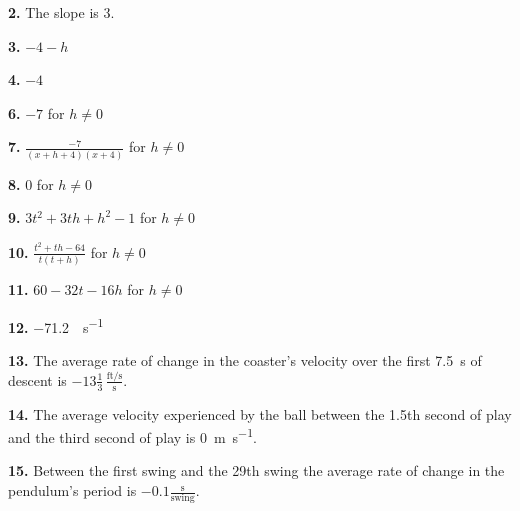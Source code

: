 \documentclass[12pt,]{book}
\theoremstyle{plain}
\theoremstyle{definition}
\numberwithin{equation}{section}
\begin{document}
                \par\smallskip
\noindent\textbf{2.}\quad{}
                    The slope is \(3\).%

                \par\smallskip
\noindent\textbf{3.}\quad{}
                    \(-4-h\)%

                \par\smallskip
\noindent\textbf{4.}\quad{}
                    \(-4\)%

                \par\smallskip
\noindent\textbf{6.}\quad{}
                    \(-7\) for \(h\neq0\)%

                \par\smallskip
\noindent\textbf{7.}\quad{}
                    \(\frac{-7}{(x+h+4)(x+4)}\) for \(h\neq0\)%

                \par\smallskip
\noindent\textbf{8.}\quad{}
                    \(0\) for \(h\neq0\)%

                \par\smallskip
\noindent\textbf{9.}\quad{}
                    \(3t^2+3th+h^2-1\) for \(h\neq0\)%

                \par\smallskip
\noindent\textbf{10.}\quad{}
                    \(\frac{t^2+th-64}{t(t+h)}\) for \(h\neq0\)%

                \par\smallskip
\noindent\textbf{11.}\quad{}
                    \(60-32t-16h\) for \(h\neq0\)%

                \par\smallskip
\noindent\textbf{12.}\quad{}
                    \SI{-71.2}{\foot\per\second}%

                \par\smallskip
\noindent\textbf{13.}\quad{}
                    The average rate of change in the coaster's velocity over the first \SI{7.5}{\second} of descent is \(-13\frac{1}{3}\,\frac{\text{ft/s}}{\text{s}}\).%

                \par\smallskip
\noindent\textbf{14.}\quad{}
                    The average velocity experienced by the ball between the 1.5th second of play and the third second of play is \SI{0}{\meter\per\second}.%

                \par\smallskip
\noindent\textbf{15.}\quad{}
                    Between the first swing and the 29th swing the average rate of change in the pendulum's period is \(-0.1\frac{\text{s}}{\text{swing}}\).%
\end{document}
